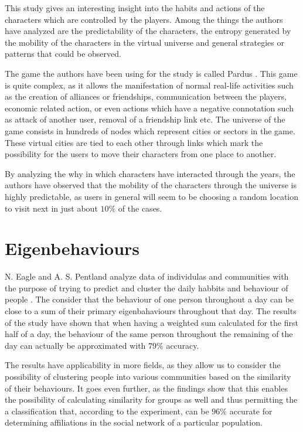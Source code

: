 This study gives an interesting insight into the habits and actions of the
characters which are controlled by the players. Among the things the authors
have analyzed are the predictability of the characters, the entropy generated by
the mobility of the characters in the virtual universe and general strategies or
patterns that could be observed.

The game the authors have been using for the study is called Pardus
\cite{Pardus}. This game is quite complex, as it allows the manifestation of
normal real-life activities such as the creation of alliances or friendships,
communication between the players, economic related action, or even actions
which have a negative connotation such as attack of another user, removal of a
friendship link etc. The universe of the game consists in hundreds of nodes
which represent cities or sectors in the game. These virtual cities are tied to
each other through links which mark the possibility for the users to move their
characters from one place to another.

By analyzing the why in which characters have interacted through the years, the
authors have observed that the mobility of the characters through the universe
is highly predictable, as users in general will seem to be choosing a random
location to visit next in just about $10\%$ of the cases.

\section{Eigenbehaviours}
N. Eagle and A. S. Pentland analyze data of individulas and communities with the
purpose of trying to predict and cluster the daily habbits and behaviour of
people \cite{Eagle09}. The consider that the behaviour of one person throughout a
day can be close to a sum of their primary eigenbahaviours throughout that day.
The results of the study have shown that when having a weighted sum calculated
for the first half of a day, the behaviour of the same person throughout the
remaining of the day can actually be approximated with $79\%$ accuracy.

The results have applicability in more fields, as they allow us to consider the
possibility of clustering people into various communities based on the
similarity of their behaviours. It goes even further, as the findings show that
this enables the possibility of calculating similarity for groups as well and
thus permitting the a classification that, according to the experiment, can be
$96\%$ accurate for determining affiliations in the social network of a
particular population.

